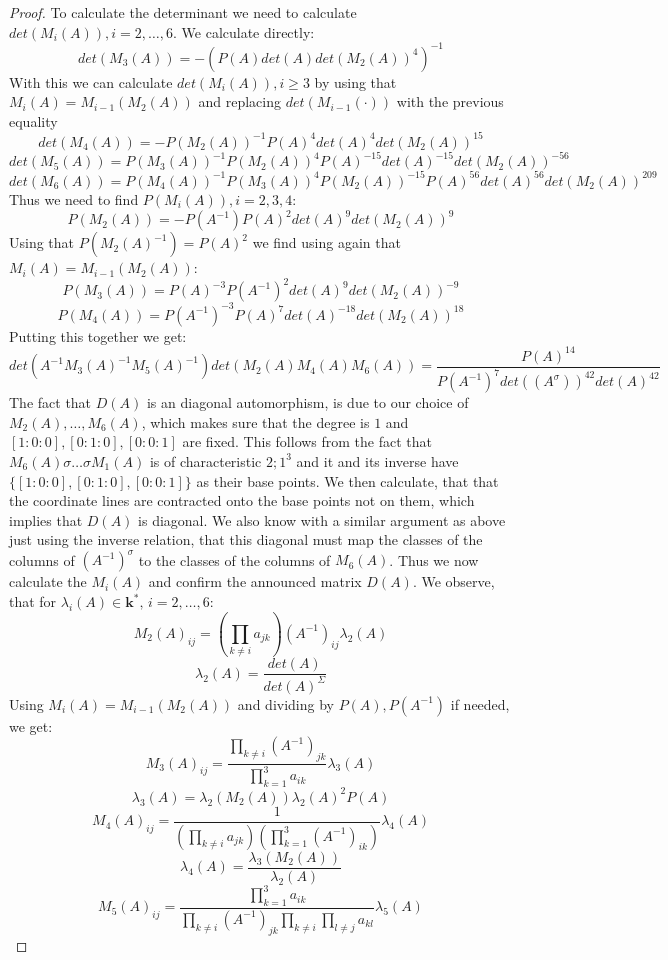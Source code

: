 \documentclass[10pt,a4paper]{amsart}
\begin{document}
\begin{proof}
    To calculate the determinant we need to calculate $det(M_i(A)), i=2, \dots , 6$. We calculate directly:
    \[det(M_3(A))=-(P(A)det(A)det(M_2(A))^4)^{-1}\]
    With this we can calculate $det(M_i(A)), i \geq 3$ by using that $M_i(A) = M_{i-1}(M_2(A))$ and replacing $det(M_{i-1}(\cdot))$ with the previous equality
    \[det(M_4(A))=-P(M_2(A))^{-1}P(A)^4det(A)^4det(M_2(A))^{15}\]
    \[det(M_5(A))=P(M_3(A))^{-1}P(M_2(A))^4P(A)^{-15}det(A)^{-15}det(M_2(A))^{-56}\]
    \[det(M_6(A))=P(M_4(A))^{-1}P(M_3(A))^4P(M_2(A))^{-15}P(A)^{56}det(A)^{56}det(M_2(A))^{209}\]
    Thus we need to find $P(M_i(A)), i=2,3,4$:
    \[P(M_2(A)) = -P(A^{-1})P(A)^2det(A)^9det(M_2(A))^9\]
    Using that $P(M_2(A)^{-1}) = P(A)^2$ we find using again that $M_i(A) = M_{i-1}(M_2(A))$:
    \[P(M_3(A)) = P(A)^{-3}P(A^{-1})^2det(A)^9det(M_2(A))^{-9}\]
    \[P(M_4(A))=P(A^{-1})^{-3}P(A)^7det(A)^{-18}det(M_2(A))^{18}\]
    Putting this together we get:
    \[det(A^{-1}M_3(A)^{-1}M_5(A)^{-1})det(M_2(A)M_4(A)M_6(A)) = \frac{P(A)^{14}}{P(A^{-1})^7 det((A^{\sigma}))^{42}det(A)^{42}}\]
    The fact that $D(A)$ is an diagonal automorphism, is due to our choice of $M_2(A), \dots , M_6(A)$, which makes sure that the degree is $1$ and $[1:0:0], [0:1:0],[0:0:1]$ are fixed. This follows from the fact that $M_6(A) \sigma \dots \sigma M_1(A)$ is of characteristic $2;1^3$ and it and its inverse have $\{ [1:0:0], [0:1:0],[0:0:1]\}$ as their base points. We then calculate, that that the coordinate lines are contracted onto the base points not on them, which implies that $D(A)$ is diagonal. We also know with a similar argument as above just using the inverse relation, that this diagonal must map the classes of the columns of $(A^{-1})^{\sigma}$ to the classes of the columns of $M_6(A)$. Thus we now calculate the $M_i(A)$ and confirm the announced matrix $D(A)$. We observe, that for $\lambda_i(A) \in \textbf{k}^*, \, i = 2, \dots , 6$:
    \[M_2(A)_{ij} = (\prod_{k \neq i} a_{jk}) (A^{-1})_{ij} \lambda_2(A)\]
    \[\lambda_2(A) = \frac{det(A)}{det(A)^{\Sigma}}\]
    Using $M_i(A) = M_{i-1}(M_2(A))$ and dividing by $P(A), P(A^{-1})$ if needed, we get:
    \[M_3(A)_{ij} = \frac{\prod_{k \neq i}(A^{-1})_{jk}}{\prod_{k = 1}^3a_{ik}} \lambda_3(A)\]
    \[\lambda_3(A) = \lambda_2(M_2(A)) \lambda_2(A)^2P(A)\]
    \[M_4(A)_{ij} = \frac{1}{(\prod_{k \neq i}a_{jk})(\prod_{k=1}^3 (A^{-1})_{ik})} \lambda_4(A)\]
    \[\lambda_4(A) = \frac{\lambda_3(M_2(A))}{\lambda_2(A)}\]
    \[M_5(A)_{ij} = \frac{\prod_{k=1}^3a_{ik}}{\prod_{k \neq i}(A^{-1})_{jk} \prod_{k \neq i} \prod_{l \neq j} a_{kl}} \lambda_5(A)\]

\end{proof}
\end{document}

